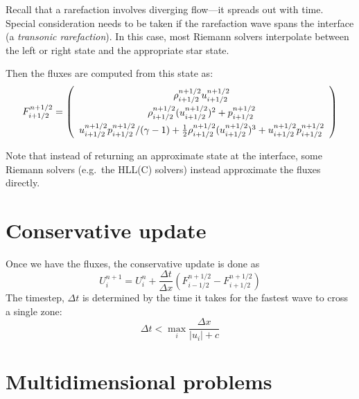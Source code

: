 Recall that a rarefaction involves diverging flow---it spreads out
with time.  Special consideration needs to be taken if the rarefaction
wave spans the interface (a {\em transonic rarefaction}).  In this
case, most Riemann solvers interpolate between the left or right state
and the appropriate star state.

Then the fluxes are computed from this state as:
\begin{equation}
\renewcommand{\arraystretch}{1.5}
F_{i+1/2}^{n+1/2} = \left ( \begin{array}{c}
                             \rho_{i+1/2}^{n+1/2} u_{i+1/2}^{n+1/2} \\
                             \rho_{i+1/2}^{n+1/2} (u_{i+1/2}^{n+1/2})^2 + p_{i+1/2}^{n+1/2} \\
                             u_{i+1/2}^{n+1/2} p_{i+1/2}^{n+1/2} / (\gamma - 1)  +
                             \frac{1}{2} \rho_{i+1/2}^{n+1/2} (u_{i+1/2}^{n+1/2})^3 +
                             u_{i+1/2}^{n+1/2} p_{i+1/2}^{n+1/2}
                            \end{array} \right )
\renewcommand{\arraystretch}{1.0}
\end{equation}

Note that instead of returning an approximate state at the interface,
some Riemann solvers (e.g.\ the HLL(C) solvers) instead approximate the
fluxes directly.

\section{Conservative update}

Once we have the fluxes, the conservative update is done as
\begin{equation}
U^{n+1}_i = U^n_i + \frac{\Delta t}{\Delta x} \left ( F_{i-1/2}^{n+1/2} - F_{i+1/2}^{n+1/2} \right )
\end{equation}
The timestep, $\Delta t$ is determined by the time it takes for the fastest
wave to cross a single zone:
\begin{equation}
\Delta t < \max_i \frac{\Delta x}{|u_i| + c}
\end{equation}
              


\section{Multidimensional problems}

